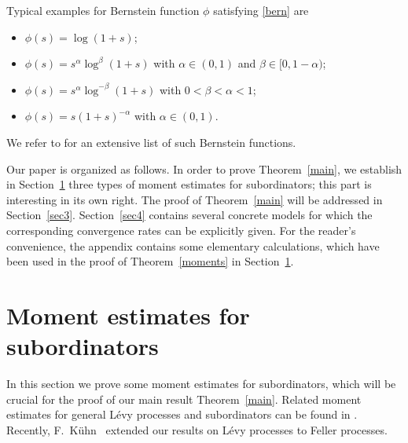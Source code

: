\documentclass{aptpub}
\numberwithin{equation}{section}
\begin{document}
\begin{rem}
    Typical examples for Bernstein function
    $\phi$ satisfying \eqref{bern} are
    \begin{itemize}
        \item
            $\phi(s)=\log(1+s)$;

        \item
            $\phi(s)=s^\alpha\log^\beta(1+s)$ with $\alpha\in(0,1)$
            and $\beta\in[0,1-\alpha)$;

        \item
            $\phi(s)=s^\alpha\log^{-\beta}(1+s)$ with
            $0<\beta<\alpha<1$;

        \item
            $\phi(s)=s(1+s)^{-\alpha}$ with $\alpha\in(0,1)$.
    \end{itemize}
    We refer to \cite{SSV12} for an extensive
    list of such Bernstein functions.
\end{rem}



Our paper is organized as follows. In order to
prove Theorem~\ref{main}, we establish in Section~\ref{sec2} three types of moment estimates for subordinators; this part is interesting in its own right. The proof of Theorem~\ref{main} will be addressed in Section~\ref{sec3}.  Section~\ref{sec4} contains several concrete models for which the corresponding convergence rates can be explicitly given. For the reader's convenience, the appendix contains some elementary calculations, which have been used in the proof of Theorem~\ref{moments} in Section~\ref{sec2}.


\section{Moment estimates for subordinators}\label{sec2}

In this section we prove some moment estimates for subordinators, which will be crucial for the proof of our main result Theorem~\ref{main}. Related moment estimates for general L\'evy processes and subordinators can be found in \cite[Section 3]{DS15b}. Recently, F.~K\"uhn~\cite{kuehn} extended our results on L\'evy processes to Feller processes.
\end{document}
